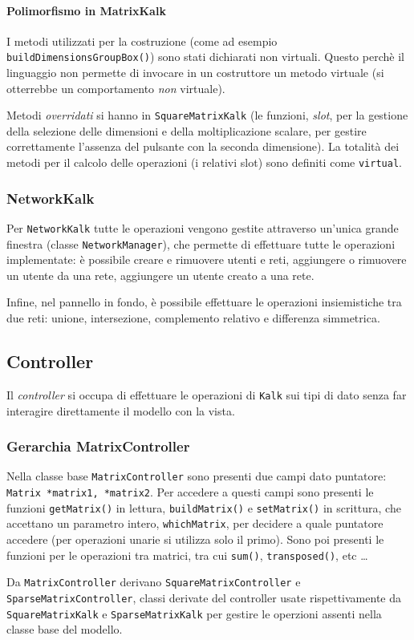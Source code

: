 \paragraph{Polimorfismo in MatrixKalk} I metodi utilizzati per la costruzione (come ad esempio \texttt{buildDimensionsGroupBox()}) sono 
stati dichiarati non virtuali. Questo
perchè il linguaggio non permette di invocare in un costruttore un metodo virtuale (si otterrebbe un comportamento \emph{non} virtuale). \par
Metodi \emph{overridati} si hanno in \texttt{SquareMatrixKalk} (le funzioni, \emph{slot}, per la gestione della selezione delle dimensioni
e della moltiplicazione scalare, per gestire correttamente l'assenza del pulsante con la seconda dimensione). La totalità dei 
metodi per il calcolo delle operazioni (i relativi slot) sono definiti come \texttt{virtual}.

\subsubsection{NetworkKalk}
Per \texttt{NetworkKalk} tutte le operazioni vengono gestite attraverso un'unica grande finestra (classe \texttt{NetworkManager}), che permette di 
effettuare tutte le operazioni implementate:
è possibile creare e rimuovere utenti e reti, aggiungere o rimuovere un utente da una rete, aggiungere un utente creato a una rete.\par
Infine, nel pannello in fondo, è possibile effettuare le operazioni insiemistiche tra due reti: unione, intersezione, complemento relativo e differenza simmetrica.

\subsection{Controller}

Il \emph{controller} si occupa di effettuare le operazioni di \texttt{Kalk} sui tipi di dato senza far interagire direttamente il modello con la vista.

\subsubsection{Gerarchia MatrixController}

Nella classe base \texttt{MatrixController} sono presenti due campi dato puntatore: \texttt{Matrix *matrix1, *matrix2}. Per accedere a questi campi sono 
presenti le funzioni \texttt{getMatrix()} in lettura, \texttt{buildMatrix()} e \texttt{setMatrix()} in scrittura, che accettano un parametro 
intero, \texttt{whichMatrix}, per decidere a quale puntatore accedere (per operazioni unarie si utilizza solo il primo). 
Sono poi presenti le funzioni per le operazioni tra matrici, tra cui \texttt{sum()}, \texttt{transposed()}, etc \dots \par
Da \texttt{MatrixController} derivano \texttt{SquareMatrixController} e \texttt{SparseMatrixController}, classi derivate del controller usate rispettivamente 
da \texttt{SquareMatrixKalk} e \texttt{SparseMatrixKalk} per gestire le operzioni assenti nella classe base del modello.

